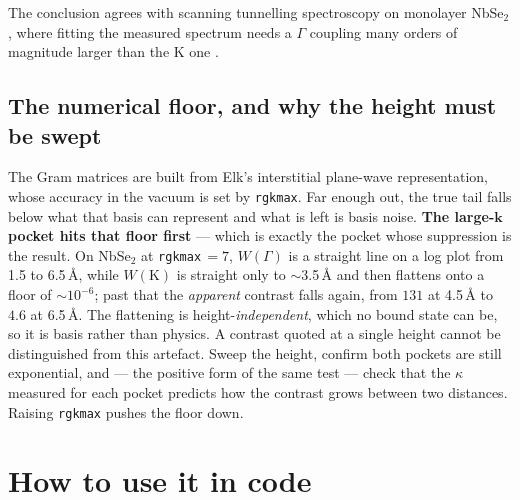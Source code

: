\documentclass[11pt]{article}
\begin{document}
The conclusion agrees with scanning
tunnelling spectroscopy on monolayer NbSe$_2$, where fitting the measured
spectrum needs a $\Gamma$ coupling many orders of magnitude larger than the K
one \cite{Siegl2025}.

\subsection{The numerical floor, and why the height must be swept}

The Gram matrices are built from Elk's interstitial plane-wave
representation, whose accuracy in the vacuum is set by \texttt{rgkmax}. Far
enough out, the true tail falls below what that basis can represent and what
is left is basis noise. \textbf{The large-$\mathbf k$ pocket hits that floor
first} --- which is exactly the pocket whose suppression is the result. On
NbSe$_2$ at \texttt{rgkmax}\,$=7$, $W(\Gamma)$ is a straight line on a log
plot from 1.5 to 6.5\,\AA, while $W(\mathrm K)$ is straight only to
$\sim$3.5\,\AA{} and then flattens onto a floor of $\sim10^{-6}$; past that
the \emph{apparent} contrast falls again, from $131$ at 4.5\,\AA{} to $4.6$
at 6.5\,\AA. The flattening is height-\emph{independent}, which no bound
state can be, so it is basis rather than physics. A contrast quoted at a
single height cannot be distinguished from this artefact. Sweep the height,
confirm both pockets are still exponential, and --- the positive form of the
same test --- check that the $\kappa$ measured for each pocket predicts how
the contrast grows between two distances. Raising \texttt{rgkmax} pushes the
floor down.

\section{How to use it in code}
\end{document}
